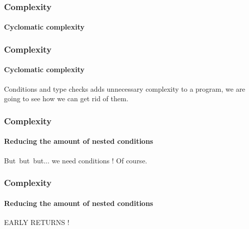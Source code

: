 \begin{frame}[fragile,c]
    \frametitle{Complexity}
    \framesubtitle{Cyclomatic complexity}

\end{frame}

\begin{frame}[fragile,c]
    \frametitle{Complexity}
    \framesubtitle{Cyclomatic complexity}

    Conditions and type checks adds unnecessary complexity to a program,
    we are going to see how we can get rid of them.
\end{frame}

\begin{frame}[fragile,c]
    \frametitle{Complexity}
    \framesubtitle{Reducing the amount of nested conditions}

    But\pause\ but\pause\ but\pause ... we need conditions !
    \pause
    Of course.
\end{frame}

\begin{frame}[fragile,c]
    \frametitle{Complexity}
    \framesubtitle{Reducing the amount of nested conditions}

    EARLY RETURNS !
\end{frame}

